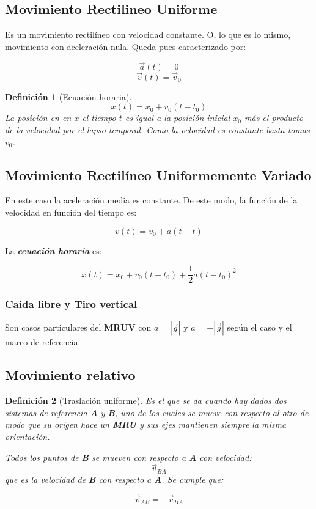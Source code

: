 \documentclass[12pt,a4paper]{article}
\newtheorem{mydef}{Definici\'on}[section]
\begin{document}
\subsection{Movimiento Rectilineo Uniforme}
Es un movimiento rectil\'ineo con velocidad constante. O, lo que es lo
mismo, movimiento con aceleraci\'on nula. Queda pues caracterizado por:

\[
\vec{a}(t) = 0 \]
\[
\vec{v}(t) = \vec{v}_0 \]



\begin{mydef}[Ecuaci\'on horaria]
\[
x(t) = x_0 + v_0(t - t_0)\]
La posici\'on en en \(x\) el tiempo \(t\) es igual a la posici\'on inicial
\(x_0\) m\'as el producto de la velocidad por el lapso temporal. Como la
velocidad es constante basta tomas \(v_0\).
\end{mydef}

\subsection{Movimiento Rectil\'ineo Uniformemente Variado}
En este caso la aceleraci\'on media es constante. De este modo, la
funci\'on de la velocidad en funci\'on del tiempo es:

\[ v(t) = v_0 + a(t-t) \]

La \textbf{\textit{ecuaci\'on horaria}} es:

\[
x(t) = x_0 + v_0(t-t_0) + \frac{1}{2} a (t-t_0)^2\]

\subsubsection{Caida libre y Tiro vertical}
Son casos particulares del \textbf{MRUV} con \( a = |\vec{g}| \) y
\(a=- |\vec{g}|\) seg\'un el caso y el marco de referencia.

\subsection{Movimiento relativo}

\begin{mydef}[Traslaci\'on uniforme]
Es el que se da cuando hay dados dos sistemas de referencia
\textbf{A} y \textbf{B}, uno de los cuales se mueve con respecto al otro
 de modo que su or\'igen hace un \textbf{MRU} y sus ejes mantienen
 siempre la misma orientaci\'on.

Todos los puntos de \textbf{B} se mueven con respecto a \textbf{A} con
velocidad:
\[ \vec{v}_{BA}\]
que es la velocidad de \textbf{B} con respecto a \textbf{A}. Se cumple
que:

\[ \vec{v}_{AB} = -\vec{v}_{BA}\]
\end{mydef}
\end{document}
